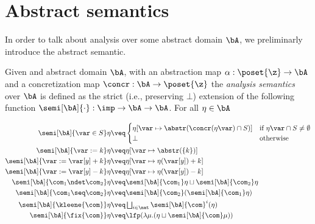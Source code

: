 \section{Abstract semantics}
\label{sec:abstractsem}

In order to talk about analysis over some abstract domain \(\bA\), we
preliminarly introduce the abstract semantic.

\begin{definition}
  Given and abstract domain \(\bA\), with an abstraction map
  \({\alpha : \poset{\z} \to \bA}\) and a concretization map
  \({\concr : \bA \to \poset{\z}}\) the \emph{analysis semantics} over
  \(\bA\) is defined as the strict (i.e., preserving \(\bot\))
  extension of the following function
  \({\semi[\bA]{\cdot} : \imp \to \bA \to \bA}\). For all
  \(\eta \in \bA\)

  \begin{align*}
    \semi[\bA]{\var \in S}\eta 
    & \veq  
      \begin{cases}
        \eta[\var \mapsto \abstr(\concr(\eta\var) \cap S)] & \text{if }\eta\var\cap S\neq \emptyset \\
        \bot & \text{otherwise}
      \end{cases}\\
    \semi[\bA]{\var := k}\eta 
    & \veq \eta[\var \mapsto \abstr(\{k\})]\\
    \semi[\bA]{\var := \var[y] + k}\eta 
    & \veq \eta[\var \mapsto \eta (\var[y]) + k]\\
    \semi[\bA]{\var := \var[y] - k}\eta 
    & \veq \eta[\var \mapsto \eta (\var[y]) - k]\\
    \semi[\bA]{\com_1 \ndet \com_2} \eta
    & \veq \semi[\bA]{\com_1} \eta \sqcup \semi[\bA]{\com_2} \eta\\
    \semi[\bA]{\com_1 \seq \com_2} \eta
    & \veq \semi[\bA]{\com_2} (\semi[\bA]{\com_1} \eta)\\
    \semi[\bA]{\kleene{\com}} \eta
    & \veq \textstyle \bigsqcup_{i \in \nat} \semi[\bA]{\com}^i (\eta)\\
    \semi[\bA]{\fix{\com}} \eta
    & \veq  \lfp(\lambda \mu. (\eta \sqcup \semi[\bA]{\com} \mu))
  \end{align*}
\end{definition}

